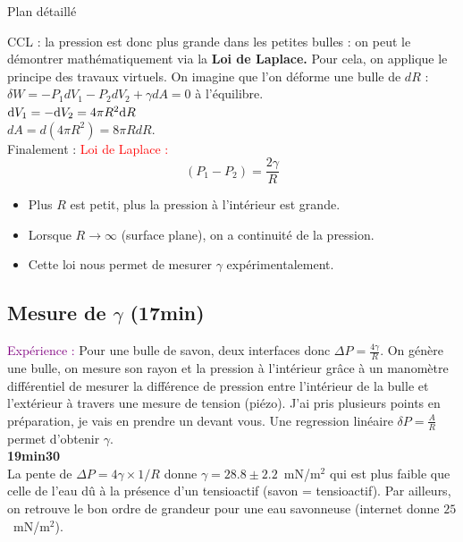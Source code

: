 \begin{reportBlock}{Plan détaillé}
\begin{center}
 \end{center}
 CCL : la pression est donc plus grande dans les petites bulles : on peut le démontrer mathématiquement via la \textbf{Loi de Laplace.}
 Pour cela, on applique le principe des travaux virtuels. On imagine que l'on déforme une bulle de $dR$ : \\
 $\delta W = -P_1dV_1-P_2dV_2+\gamma dA =0$ à l'équilibre.\\
 $\mathrm{d} V_1 = - \mathrm{d} V_2 = 4 \pi R^2 \mathrm{d} R$\\
 $dA = d(4\pi R^2) = 8\pi RdR$.\\
 Finalement : 
 \textcolor{red}{Loi de Laplace : }
 \begin{equation}
     (P_1-P_2)=\frac{2\gamma}{R}
 \end{equation}
 \begin{itemize}
     \item Plus $R$ est petit, plus la pression à l'intérieur est grande. 
     \item Lorsque $R \rightarrow \infty$ (surface plane), on a continuité de la pression.
     \item Cette loi nous permet de mesurer $\gamma$ expérimentalement.
 \end{itemize}
 \subsection{Mesure de $\gamma$ (17min)}
 \textcolor{purple}{Expérience :}  Pour une bulle de savon, deux interfaces donc $\Delta P =\frac{4\gamma}{R}$. On génère une bulle, on mesure son rayon et la pression à l'intérieur grâce à un manomètre différentiel de mesurer la différence de pression entre l'intérieur de la bulle et l'extérieur à travers une mesure de tension (piézo). J'ai pris plusieurs points en préparation, je vais en prendre un devant vous. Une regression linéaire $\delta P = \frac{A}{R}$ permet d'obtenir $\gamma$. \\
 \textbf{19min30}\\

La pente de $\Delta P = 4 \gamma\times 1/R$ donne $\gamma=28.8 \pm 2.2$~mN/m$^2$ qui est plus faible que celle de l'eau dû à la présence d'un tensioactif (savon = tensioactif). Par ailleurs, on retrouve le bon ordre de grandeur pour une eau savonneuse (internet donne $25$~mN/m$^2$). \\



\end{reportBlock}
